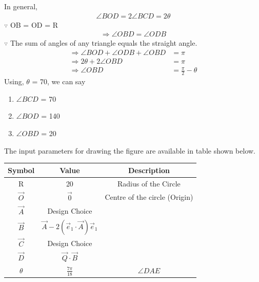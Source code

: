 \documentclass[journal,12pt,twocolumn]{IEEEtran}
\begin{document}
In general,
\begin{align}
    \angle{BOD} = 2\angle{BCD} = 2\theta
\end{align}
$\because$ OB = OD = R
\begin{align}
    \Rightarrow \angle{OBD} = \angle{ODB}
\end{align}
$\because$ The sum of angles of any triangle equals the straight angle.
\begin{align}
        \Rightarrow \angle{BOD} + \angle{ODB} + \angle{OBD} &= \pi\\
        \Rightarrow 2\theta+2\angle{OBD} &= \pi\\
        \Rightarrow \angle{OBD} &= \frac{\pi}{2}-\theta
\end{align}
Using, $\theta$ = 70\textdegree, we can say
\begin{enumerate}
    \item $\angle{BCD}$ = 70\textdegree
    \item $\angle{BOD}$ = 140\textdegree
    \item $\angle{OBD}$ = 20\textdegree
\end{enumerate}
The input parameters for drawing the figure are available in table shown below.
\begin{table}[!h]
    \begin{tabular}{|c|c|c|} \hline
        \textbf{Symbol} & \textbf{Value}    & \textbf{Description}          \\ \hline
        R               & 20                & Radius of the Circle          \\ \hline
        $\vec{O}$       & $\vec{0}$        & Centre of the circle (Origin) \\\hline
        $\vec{A}$       &Design Choice& \\\hline
        $\vec{B}$       &  $\vec{A} - 2(\vec{e}_1\cdot\vec{A})\vec{e}_1$ & \\\hline
        $\vec{C}$       &Design Choice& \\\hline
        $\vec{D}$       & $\vec{Q}\cdot\vec{B}$ & \\\hline
        $\theta$        & $\frac{7\pi}{18}$ & $\angle{DAE}$                 \\\hline
    \end{tabular}
\end{table}
\end{document}
